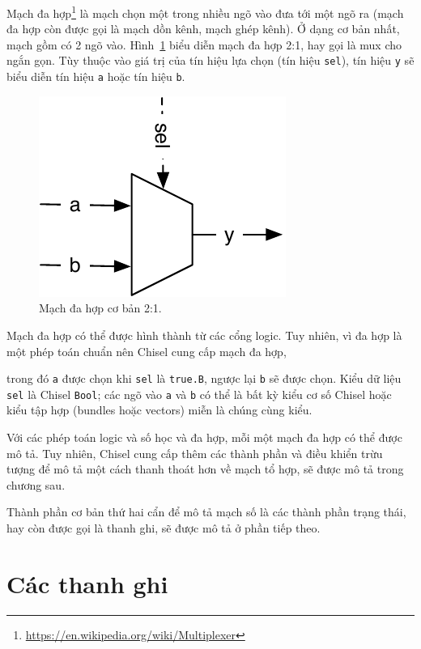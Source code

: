 \documentclass[%
    10pt,
    headinclude, footexclude,
    openright, %
    notitlepage,
    cleardoubleempty,
    headsepline,
    pointlessnumbers,
    bibtotoc, idxtotoc,
    ]{scrbook}
\newcommand{\code}[1]{{\small{\texttt{#1}}}}
\newcommand{\scale}{0.7}
\newcommand{\myref}[2]{\href{#1}{#2}}
\renewcommand{\myref}[2]{{#2}{\footnote{\url{#1}}}}
\begin{document}

\myref{https://en.wikipedia.org/wiki/Multiplexer}{Mạch đa hợp} là mạch chọn một trong nhiều ngõ vào đưa tới một ngõ ra (mạch đa hợp còn được gọi là mạch dồn kênh, mạch ghép kênh).
Ở dạng cơ bản nhất, mạch gồm có 2 ngõ vào. Hình~\ref{fig:mux} biểu diễn
mạch đa hợp 2:1, hay gọi là mux cho ngắn gọn. Tùy thuộc vào giá trị của
tín hiệu lựa chọn (tín hiệu \code{sel}), tín hiệu \code{y} sẽ biểu diễn tín hiệu \code{a} hoặc
tín hiệu \code{b}.

\begin{figure}
  \centering
  \includegraphics[scale=\scale]{figures/mux}
  \caption{Mạch đa hợp cơ bản 2:1.}
  \label{fig:mux}
\end{figure}

Mạch đa hợp có thể được hình thành từ các cổng logic.
Tuy nhiên, vì đa hợp là một phép toán chuẩn nên Chisel cung cấp mạch đa hợp,


\noindent trong đó \code{a} được chọn khi \code{sel} là \code{true.B}, ngược lại \code{b}
sẽ được chọn. Kiểu dữ liệu \code{sel} là Chisel \code{Bool}; các ngõ vào \code{a} và \code{b}
có thể là bất kỳ kiểu cơ số Chisel hoặc kiểu tập hợp (bundles hoặc vectors) miễn là chúng cùng kiểu.

Với các phép toán logic và số học và đa hợp, mỗi một mạch đa hợp có thể được mô tả.
Tuy nhiên, Chisel cung cấp thêm các thành phần và điều khiển trừu tượng để mô tả một cách thanh thoát hơn về mạch tổ 
hợp, sẽ được mô tả trong chương sau.

Thành phần cơ bản thứ hai cẩn để mô tả mạch số là các thành phần trạng thái,
hay còn được gọi là thanh ghi, sẽ được mô tả ở phần tiếp theo.

\section{Các thanh ghi}
\end{document}
